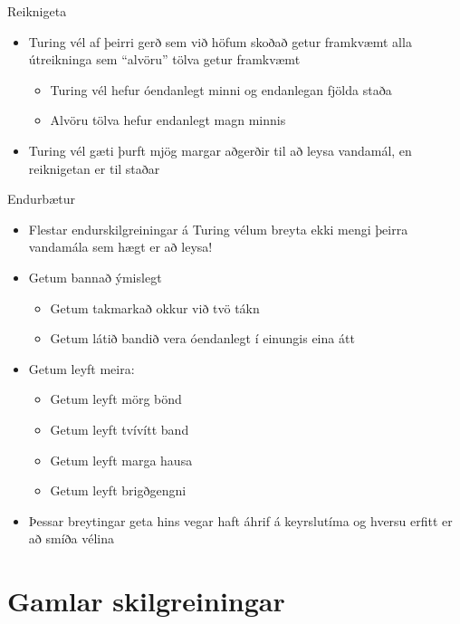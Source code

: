\documentclass{beamer}
\begin{document}
\begin{frame}{Reiknigeta}
\begin{itemize}
 \item Turing vél af þeirri gerð sem við höfum skoðað getur framkvæmt alla útreikninga sem ``alvöru'' tölva getur framkvæmt
 \begin{itemize}
  \item Turing vél hefur óendanlegt minni og endanlegan fjölda staða
  \item Alvöru tölva hefur endanlegt magn minnis
 \end{itemize}
 \item Turing vél gæti þurft mjög margar aðgerðir til að leysa vandamál, en reiknigetan er til staðar
\end{itemize}
\end{frame}

\begin{frame}{Endurbætur}
\begin{itemize}
 \item Flestar endurskilgreiningar á Turing vélum breyta ekki mengi þeirra vandamála sem hægt er að leysa!
 \item Getum bannað ýmislegt
 \begin{itemize}
  \item Getum takmarkað okkur við tvö tákn
  \item Getum látið bandið vera óendanlegt í einungis eina átt
 \end{itemize}
 \item Getum leyft meira:
 \begin{itemize}
  \item Getum leyft mörg bönd
  \item Getum leyft tvívítt band
  \item Getum leyft marga hausa
  \item Getum leyft brigðgengni
 \end{itemize}
 \item Þessar breytingar geta hins vegar haft áhrif á keyrslutíma og hversu erfitt er að smíða vélina
\end{itemize}
\end{frame}

\section{Gamlar skilgreiningar}
\end{document}
